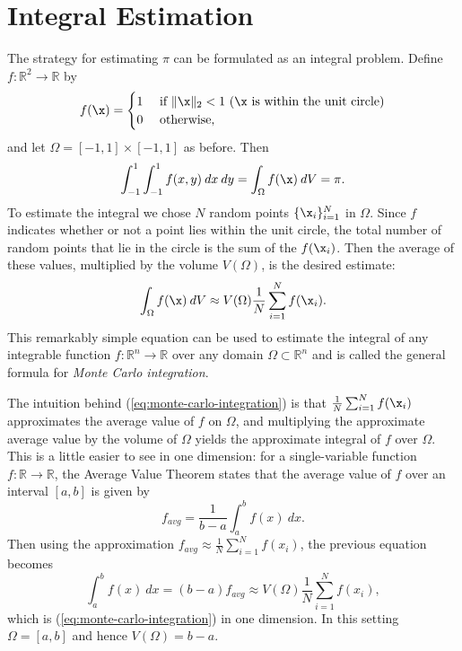 \section*{Integral Estimation} %

The strategy for estimating $\pi$ can be formulated as an integral problem.
Define $f:\mathbb{R}^2\rightarrow\mathbb{R}$ by
\[
f(\x) =
\begin{cases}
1 &\mbox{ if $\|\x\|_2 < 1$ ($\x$ is within the unit circle)} \\
0 &\mbox{ otherwise,}
\end{cases}
\]
and let $\Omega = [-1,1] \times [-1,1]$ as before.
Then
\[
\int_{-1}^1\int_{-1}^1 f(x,y)\:dx\:dy = \int_\Omega f(\x)\:dV = \pi.
\]
To estimate the integral we chose $N$ random points $\{\x_i\}_{i=1}^N$ in $\Omega$.
Since $f$ indicates whether or not a point lies within the unit circle, the total number of random points that lie in the circle is the sum of the $f(\x_i)$.
Then the average of these values, multiplied by the volume $V(\Omega)$, is the desired estimate:
\begin{equation}
\int_\Omega f(\x)\:dV \approx V(\Omega) \frac{1}{N} \sum_{i=1}^N f(\x_i).
\label{eq:monte-carlo-integration}
\end{equation}
This remarkably simple equation can be used to estimate the integral of any integrable function $f:\mathbb{R}^n\rightarrow \mathbb{R}$ over any domain $\Omega \subset \mathbb{R}^n$ and is called the general formula for \emph{Monte Carlo integration}.

The intuition behind (\ref{eq:monte-carlo-integration}) is that $\frac{1}{N} \sum_{i=1}^N f(\x_i)$ approximates the average value of $f$ on $\Omega$, and multiplying the approximate average value by the volume of $\Omega$ yields the approximate integral of $f$ over $\Omega$.
This is a little easier to see in one dimension: for a single-variable function $f:\mathbb{R}\rightarrow\mathbb{R}$, the Average Value Theorem states that the average value of $f$ over an interval $[a,b]$ is given by
\[
f_{avg} = \frac{1}{b-a}\int_a^b f(x)\:dx.
\]
Then using the approximation $f_{avg} \approx \frac{1}{N} \sum_{i=1}^N f(x_i)$, the previous equation becomes
\begin{equation}
\int_a^b f(x)\:dx = (b - a) f_{avg} \approx V(\Omega)\frac{1}{N}\sum_{i=1}^N f(x_i),
\label{eq:monte-carlo-integration-1d}
\end{equation}
which is (\ref{eq:monte-carlo-integration}) in one dimension.
In this setting $\Omega = [a,b]$ and hence $V(\Omega) = b - a$.

